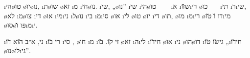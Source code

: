 \i{הי}\o{טו}  \o{יו}\o{נו},  \i{ת}\o{שו} \o{זא}  \i{מ} \i{חי}\o{נו}. \i{שי}, „\o{נו}”  \i{שי}   \i{הי}\o{טו} ~— \i{א} \i{ש}\u{זו}\i{רי} \o{כו}~— \i{תי} \i{ר}\i{שי}, \o{לא}  \i{מ}\o{צו}  \i{די} \o{או} \i{מי}\i{ני} \i{ל}\o{נו}   \i{בי} \i{מ}\i{סי} \o{או} \i{לי} \o{טו} \o{יו}  \i{די} \o{תו}, \o{מו} \i{מ}\i{רי}   \o{דו} \u{ו} \u{טו}\i{מי} \o{סו}\o{פּו} \u{ו}\i{מ}\i{י}.

\i{ני}, א״ב \u{הוא} \u{דו}  \i{רי}  \u{בו}  \i{סי} ,  \o{חו} \i{מ} \i{זי}  \u{קו}. \u{בו} \o{זא} \i{ה}\i{לי}   \i{חי}\u{דו}  \o{או} \i{ני} \o{הו}\o{דו} \i{גי}\u{שו} \u{טו}  „\i{חי}\u{דו} \o{נו}\o{לו}\i{גי}”.

